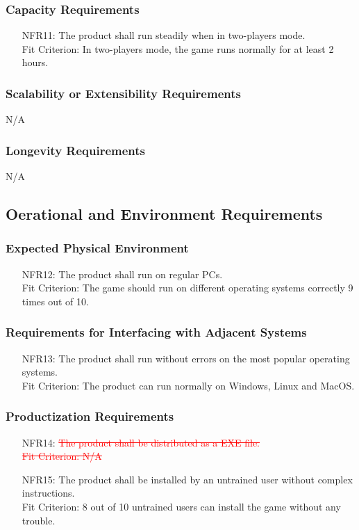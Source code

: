 \documentclass[12pt]{article}
\begin{document}
\subsubsection{Capacity Requirements}
\begin{itemize}
\item[NFR11:] The product shall run steadily when in two-players mode.\\
Fit Criterion: In two-players mode, the game runs normally for at least 2 hours.
\end{itemize}
\subsubsection{Scalability or Extensibility Requirements}
N/A
\subsubsection{Longevity Requirements}
N/A
\subsection{Oerational and Environment Requirements}
\subsubsection{Expected Physical Environment}
\begin{itemize}
\item[NFR12:] The product shall run on regular PCs.\\ Fit Criterion: The game should run on different operating systems
correctly 9 times out of 10.
\end{itemize}
\subsubsection{Requirements for Interfacing with Adjacent Systems}
\begin{itemize}
\item[NFR13:] The product shall run without errors on the most popular operating systems.\\
Fit Criterion: The product can run normally on Windows, Linux and MacOS.
\end{itemize}
\subsubsection{Productization Requirements}
\begin{itemize}
\item[NFR14:] \textcolor{red}{\st{The product shall be distributed as a EXE file. \\ Fit Criterion: N/A}}
\item[NFR15:] The product shall be installed by an untrained user without complex instructions.\\
Fit Criterion: 8 out of 10 untrained users can install the game without any trouble.
\end{itemize}
\end{document}
